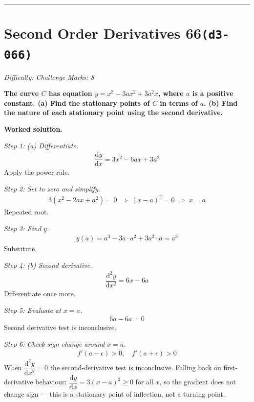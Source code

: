 \documentclass[11pt]{article}
\newcommand{\question}[1]{\par\medskip\noindent\textbf{#1}\par}
\begin{document}
\medskip\hrule

\section*{Second Order Derivatives 66\quad\small\texttt{(d3-066)}}
\textit{Difficulty: Challenge \quad\textbar\quad Marks: 8}

\question{The curve \( C \) has equation \( y = x^3 - 3ax^2 + 3a^2 x \), where \( a \) is a positive constant. (a) Find the stationary points of \( C \) in terms of \( a \). (b) Find the nature of each stationary point using the second derivative.}

\textbf{Worked solution.}

\textit{Step 1: (a) Differentiate.}
\[\begin{gathered}
\dfrac{\mathrm{d}y}{\mathrm{d}x} = 3x^2 - 6ax + 3a^2
\end{gathered}\]
Apply the power rule.

\textit{Step 2: Set to zero and simplify.}
\[\begin{gathered}
3(x^2 - 2ax + a^2) = 0 \;\Rightarrow\; (x - a)^2 = 0 \;\Rightarrow\; x = a
\end{gathered}\]
Repeated root.

\textit{Step 3: Find \( y \).}
\[\begin{gathered}
y(a) = a^3 - 3a \cdot a^2 + 3a^2 \cdot a = a^3
\end{gathered}\]
Substitute.

\textit{Step 4: (b) Second derivative.}
\[\begin{gathered}
\dfrac{\mathrm{d}^2y}{\mathrm{d}x^2} = 6x - 6a
\end{gathered}\]
Differentiate once more.

\textit{Step 5: Evaluate at \( x = a \).}
\[\begin{gathered}
6a - 6a = 0
\end{gathered}\]
Second derivative test is inconclusive.

\textit{Step 6: Check sign change around \( x = a \).}
\[\begin{gathered}
f'(a - \epsilon) > 0, \quad f'(a + \epsilon) > 0
\end{gathered}\]
When \( \dfrac{\mathrm{d}^2y}{\mathrm{d}x^2} = 0 \) the second-derivative test is inconclusive. Falling back on first-derivative behaviour: \( \dfrac{\mathrm{d}y}{\mathrm{d}x} = 3(x-a)^2 \geq 0 \) for all \(x\), so the gradient does not change sign --- this is a stationary point of inflection, not a turning point.
\end{document}
